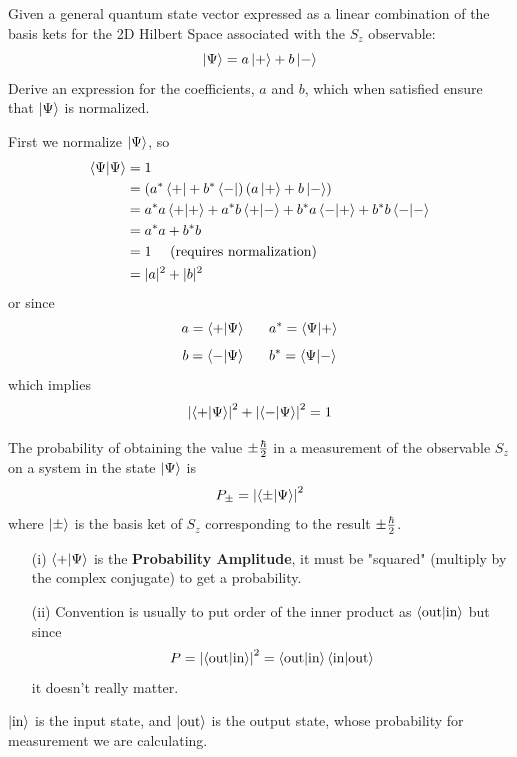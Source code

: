 \documentclass[english, 11pt]{article}
\begin{document}
          \begin{exmp}
            Given a general quantum state vector expressed as a linear combination of the basis kets for the 2D Hilbert Space associated with the $S_z$ observable:
            \[ \left|\Psi\right\rangle = a \left|+\right\rangle + b\left|-\right\rangle \]
            Derive an expression for the coefficients, $a$ and $b$, which when satisfied ensure that $\left|\Psi\right\rangle$ is normalized.
          \end{exmp}

          First we normalize $\left|\Psi\right\rangle$, so
          \begin{align*}
             \braket{\Psi}{\Psi} & = 1 \\
             &= \left( a^*\bra{+} + b^*\bra{-} \right)\left( a\ket{+} + b\ket{-} \right) \\
             & =a^*a\braket{+}{+} + a^*b\braket{+}{-} + b^*a\braket{-}{+} + b^*b\braket{-}{-} \\
             & = a^*a + b^*b \\
             & = 1 \mbox{ \ \ \ (requires normalization)} \\
             & = |a|^2 + |b|^2
          \end{align*}
          or since
          \[ a = \braket{+}{\Psi} \ \ \ \ \ a^* = \braket{\Psi}{+} \]
          \[ b = \braket{-}{\Psi} \ \ \ \ \ b^* = \braket{\Psi}{-} \]
          which implies
          \[ \left| \braket{+}{\Psi} \right|^2 + \left| \braket{-}{\Psi} \right|^2 = 1 \]

          \begin{defn}[Postulate 4]\label{postulate_4}
            The probability of obtaining the value $\pm \frac{\hbar}{2}$ in a measurement of the observable $S_z$ on a system in the state $\left|\Psi\right\rangle$ is
            \[ P_{\pm} = \left| \braket{\pm}{\Psi} \right|^2 \]
            where $\left|\pm\right\rangle$ is the basis ket of $S_z$ corresponding to the result $\pm \frac{\hbar}{2}$.
          \end{defn}

          \begin{itemize}
            \item[(i)] $\braket{+}{\Psi}$ is the \textbf{Probability Amplitude}, it must be "squared" (multiply by the complex conjugate) to get a probability.
            \item[(ii)] Convention is usually to put order of the inner product as $\braket{\mbox{out}}{\mbox{in}}$ but since
            \[ P = \left| \braket{\mbox{out}}{\mbox{in}}\right|^2  = \braket{\mbox{out}}{\mbox{in}} \braket{\mbox{in}}{\mbox{out}}\]
            it doesn't really matter.
          \end{itemize}
          $\left|\mbox{in}\right\rangle$ is the input state, and $\left|\mbox{out}\right\rangle$ is the output state, whose probability for measurement we are calculating.
\end{document}
